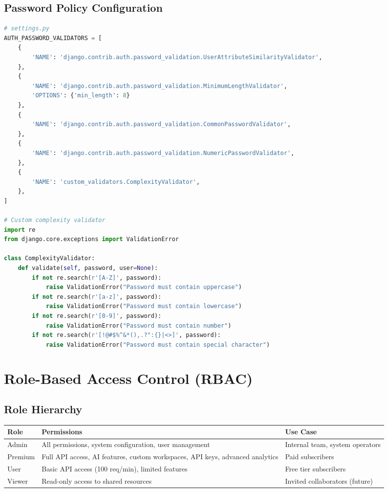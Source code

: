 \documentclass{report}
\begin{document}
\subsection{Password Policy Configuration}
\begin{lstlisting}[language=Python]
# settings.py
AUTH_PASSWORD_VALIDATORS = [
    {
        'NAME': 'django.contrib.auth.password_validation.UserAttributeSimilarityValidator',
    },
    {
        'NAME': 'django.contrib.auth.password_validation.MinimumLengthValidator',
        'OPTIONS': {'min_length': 8}
    },
    {
        'NAME': 'django.contrib.auth.password_validation.CommonPasswordValidator',
    },
    {
        'NAME': 'django.contrib.auth.password_validation.NumericPasswordValidator',
    },
    {
        'NAME': 'custom_validators.ComplexityValidator',
    },
]

# Custom complexity validator
import re
from django.core.exceptions import ValidationError

class ComplexityValidator:
    def validate(self, password, user=None):
        if not re.search(r'[A-Z]', password):
            raise ValidationError("Password must contain uppercase")
        if not re.search(r'[a-z]', password):
            raise ValidationError("Password must contain lowercase")
        if not re.search(r'[0-9]', password):
            raise ValidationError("Password must contain number")
        if not re.search(r'[!@#$%^&*(),.?":{}|<>]', password):
            raise ValidationError("Password must contain special character")
\end{lstlisting}

\section{Role-Based Access Control (RBAC)}

\subsection{Role Hierarchy}
\begin{table}[h]
\centering
\begin{tabular}{|l|p{3.5cm}|p{3.5cm}|}
\hline
\textbf{Role} & \textbf{Permissions} & \textbf{Use Case} \\
\hline
Admin & All permissions, system configuration, user management & Internal team, system operators \\
\hline
Premium & Full API access, AI features, custom workspaces, API keys, advanced analytics & Paid subscribers \\
\hline
User & Basic API access (100 req/min), limited features & Free tier subscribers \\
\hline
Viewer & Read-only access to shared resources & Invited collaborators (future) \\
\hline
\end{tabular}
\end{table}
\end{document}
